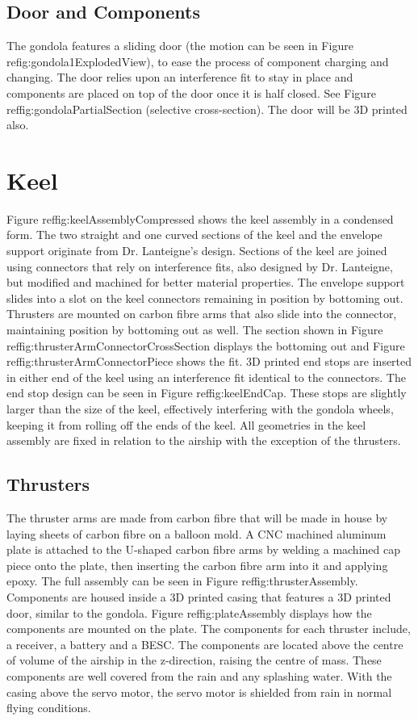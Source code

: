 \documentclass[../main.tex]{subfiles}
\begin{document}
\subsection{Door and Components}
The gondola features a sliding door (the motion can be seen in Figure re{fig:gondola1ExplodedView}), to ease the process of component charging and changing. The door relies upon an interference fit to stay in place and components are placed on top of the door once it is half closed. See Figure ref{fig:gondolaPartialSection} (selective cross-section). The door will be 3D printed also.
\\
\section{Keel}
Figure ref{fig:keelAssemblyCompressed} shows the keel assembly in a condensed form. The two straight and one curved sections of the keel and the envelope support originate from Dr. Lanteigne's design. Sections of the keel are joined using connectors that rely on interference fits, also designed by Dr. Lanteigne, but modified and machined for better material properties. The envelope support slides into a slot on the keel connectors remaining in position by bottoming out. Thrusters are mounted on carbon fibre arms that also slide into the connector, maintaining position by bottoming out as well. The section shown in Figure ref{fig:thrusterArmConnectorCrossSection} displays the bottoming out and Figure ref{fig:thrusterArmConnectorPiece} shows the fit. 3D printed end stops are inserted in either end of the keel using an interference fit identical to the connectors. The end stop design can be seen in Figure ref{fig:keelEndCap}. These stops are slightly larger than the size of the keel, effectively interfering with the gondola wheels, keeping it from rolling off the ends of the keel. All geometries in the keel assembly are fixed in relation to the airship with the exception of the thrusters.
\\
\subsection{Thrusters}
The thruster arms are made from carbon fibre that will be made in house by laying sheets of carbon fibre on a balloon mold. A CNC machined aluminum plate is attached to the U-shaped carbon fibre arms by welding a machined cap piece onto the plate, then inserting the carbon fibre arm into it and applying epoxy. The full assembly can be seen in Figure ref{fig:thrusterAssembly}.  Components are housed inside a 3D printed casing that features a 3D printed door, similar to the gondola. Figure ref{fig:plateAssembly} displays how the components are mounted on the plate. The components for each thruster include, a receiver, a battery and a BESC. The components are located above the centre of volume of the airship in the z-direction, raising the centre of mass. These components are well covered from the rain and any splashing water. With the casing above the servo motor, the servo motor is shielded from rain in normal flying conditions.\\
\end{document}
